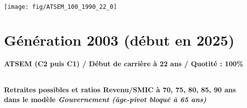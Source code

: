  \vspace{0.1cm} 

 {\hspace{-2.2cm}\texttt{[image: fig/ATSEM\_100\_1990\_22\_0]}} 

\newpage 
 
\section{Génération 2003 (début en 2025)\label{ATSEM_100_2003_22_0}} 
 
{\bf \noindent ATSEM (C2 puis C1) / Début de carrière à 22 ans / Quotité : 100\%}  ~ 

 ~\\{\bf \noindent Retraites possibles et ratios Revenu/SMIC à 70, 75, 80, 85, 90 ans dans le modèle \emph{Gouvernement (âge-pivot bloqué à 65 ans)}}  
 
